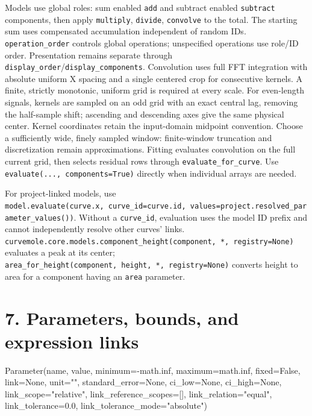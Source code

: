 \documentclass[
  10pt,
  a4paper,
  oneside]{scrreprt}
\newenvironment{Shaded}{}{}
\newcommand{\FloatTok}[1]{\textcolor[rgb]{0.25,0.63,0.44}{#1}}
\newcommand{\NormalTok}[1]{#1}
\newcommand{\OperatorTok}[1]{\textcolor[rgb]{0.40,0.40,0.40}{#1}}
\newcommand{\StringTok}[1]{\textcolor[rgb]{0.25,0.44,0.63}{#1}}
\newcommand{\VariableTok}[1]{\textcolor[rgb]{0.10,0.09,0.49}{#1}}
\begin{document}
Models use global roles: sum enabled \texttt{add} and subtract enabled
\texttt{subtract} components, then apply \texttt{multiply},
\texttt{divide}, \texttt{convolve} to the total. The starting sum uses
compensated accumulation independent of random IDs.
\texttt{operation\_order} controls global operations; unspecified
operations use role/ID order. Presentation remains separate through
\texttt{display\_order}/\texttt{display\_components}. Convolution uses
full FFT integration with absolute uniform X spacing and a single
centered crop for consecutive kernels. A finite, strictly monotonic,
uniform grid is required at every scale. For even-length signals,
kernels are sampled on an odd grid with an exact central lag, removing
the half-sample shift; ascending and descending axes give the same
physical center. Kernel coordinates retain the input-domain midpoint
convention. Choose a sufficiently wide, finely sampled window:
finite-window truncation and discretization remain approximations.
Fitting evaluates convolution on the full current grid, then selects
residual rows through \texttt{evaluate\_for\_curve}. Use
\texttt{evaluate(...,\ components=True)} directly when individual arrays
are needed.

For project-linked models, use
\texttt{model.evaluate(curve.x,\ curve\_id=curve.id,\ values=project.resolved\_parameter\_values())}.
Without a \texttt{curve\_id}, evaluation uses the model ID prefix and
cannot independently resolve other curves' links.
\texttt{curvemole.core.models.component\_height(component,\ *,\ registry=None)}
evaluates a peak at its center;
\texttt{area\_for\_height(component,\ height,\ *,\ registry=None)}
converts height to area for a component having an \texttt{area}
parameter.

\hypertarget{parameters-bounds-and-expression-links}{%
\section{7. Parameters, bounds, and expression
links}\label{parameters-bounds-and-expression-links}}

\begin{Shaded}
\begin{Highlighting}[]
\NormalTok{Parameter(name, value, minimum}\OperatorTok{={-}}\NormalTok{math.inf, maximum}\OperatorTok{=}\NormalTok{math.inf, fixed}\OperatorTok{=}\VariableTok{False}\NormalTok{,}
\NormalTok{          link}\OperatorTok{=}\VariableTok{None}\NormalTok{, unit}\OperatorTok{=}\StringTok{""}\NormalTok{, standard\_error}\OperatorTok{=}\VariableTok{None}\NormalTok{, ci\_low}\OperatorTok{=}\VariableTok{None}\NormalTok{, ci\_high}\OperatorTok{=}\VariableTok{None}\NormalTok{,}
\NormalTok{          link\_scope}\OperatorTok{=}\StringTok{"relative"}\NormalTok{, link\_reference\_scopes}\OperatorTok{=}\NormalTok{[], link\_relation}\OperatorTok{=}\StringTok{"equal"}\NormalTok{,}
\NormalTok{          link\_tolerance}\OperatorTok{=}\FloatTok{0.0}\NormalTok{, link\_tolerance\_mode}\OperatorTok{=}\StringTok{"absolute"}\NormalTok{)}
\end{Highlighting}
\end{Shaded}
\end{document}
